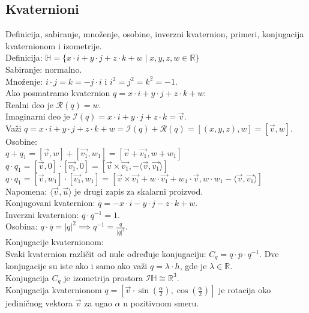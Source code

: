 \documentclass[12pt]{article}
\newcommand{\vek}[1]{\overrightarrow{#1}}
\begin{document}
    \subsection{Kvaternioni}
    Definicija, sabiranje, množenje, osobine, inverzni
    kvaternion, primeri, konjugacija kvaternionom i izometrije.
    \\[1cm]
Definicija: $\mathbb{H}=\{x\cdot i+y\cdot j+z\cdot k+w\mid x,y,z,w\in\mathbb{R}\}$\\
Sabiranje: normalno.\\
Množenje: $i\cdot j=k=-j\cdot i$ i $i^2=j^2=k^2=-1$.\\
Ako posmatramo kvaternion $q=x\cdot i +y\cdot j +z\cdot k+w$:\\
Realni deo je $\mathcal{R}(q)=w$.\\
Imaginarni deo je $\mathcal{I}(q)=x\cdot i +y\cdot j +z\cdot k=\vek{v}$.\\
Važi $q=x\cdot i +y\cdot j +z\cdot k+w=\mathcal{I}(q)+\mathcal{R}(q)=[(x,y,z),w]=[\vek{v},w]$.\\
Osobine:\\
$q+q_1=[\vek{v},w]+[\vek{v_1},w_1]=[\vek{v}+\vek{v_1},w+w_1]$\\
$q\cdot q_1=[\vek{v},0]\cdot[\vek{v_1},0]=[\vek{v}\times\vek{v_1},-\langle\vek{v},\vek{v_1}\rangle]$\\
$q\cdot q_1=[\vek{v},w_1]\cdot[\vek{v_1},w_1]=[\vek{v}\times\vek{v_1}+w\cdot \vek{v_1}+w_1\cdot\vek{v},w\cdot w_1-\langle\vek{v},\vek{v_1}\rangle]$\\
Napomena: $\langle\vek{v},\vek{u}\rangle$ je drugi zapis za skalarni proizvod.\\
Konjugovani kvaternion: $\overline{q}=-x\cdot i -y\cdot j -z\cdot k+w$.\\
Inverzni kvaternion: $q\cdot q^{-1}=1$.\\
Osobina: $q\cdot \overline{q}=|q|^2 \implies q^{-1}=\frac{\overline{q}}{|q|^2}$.\\
Konjugacije kvaternionom:\\
Svaki kvaternion različit od nule određuje konjugaciju: $C_q=q\cdot p \cdot q^{-1}$.
Dve konjugacije su iste ako i samo ako važi $q=\lambda\cdot h$, gde je $\lambda\in\mathbb{R}$.\\
Konjugacija $C_q$ je izometrija prostora $\mathcal{I}\mathbb{H}\cong\mathbb{R}^3$.\\
Konjugacija kvaternionom $q=[\vek{v}\cdot\sin(\frac{\alpha}{2}),\cos(\frac{\alpha}{2})]$
je rotacija oko jediničnog vektora $\vek{v}$
za ugao $\alpha$ u pozitivnom smeru.
\par
\end{document}
